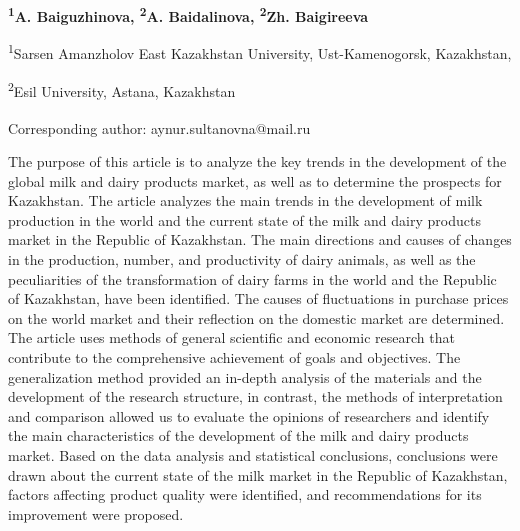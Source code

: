 
\begin{articleheader}

{\bfseries
\textsuperscript{1}A. Baiguzhinova,
\textsuperscript{2}A. Baidalinova\textsuperscript{\envelope},
\textsuperscript{2}Zh. Baigireeva
}
\end{articleheader}

\begin{affiliation}
\textsuperscript{1}Sarsen Amanzholov East Kazakhstan University, Ust-Kamenogorsk, Kazakhstan,

\textsuperscript{2}Esil University, Astana, Kazakhstan

\raggedright \textsuperscript{\envelope }Corresponding author: aynur.sultanovna@mail.ru
\end{affiliation}

The purpose of this article is to analyze the key trends in the
development of the global milk and dairy products market, as well as to
determine the prospects for Kazakhstan. The article analyzes the main
trends in the development of milk production in the world and the
current state of the milk and dairy products market in the Republic of
Kazakhstan. The main directions and causes of changes in the production,
number, and productivity of dairy animals, as well as the peculiarities
of the transformation of dairy farms in the world and the Republic of
Kazakhstan, have been identified. The causes of fluctuations in purchase
prices on the world market and their reflection on the domestic market
are determined. The article uses methods of general scientific and
economic research that contribute to the comprehensive achievement of
goals and objectives. The generalization method provided an in-depth
analysis of the materials and the development of the research structure,
in contrast, the methods of interpretation and comparison allowed us to
evaluate the opinions of researchers and identify the main
characteristics of the development of the milk and dairy products
market. Based on the data analysis and statistical conclusions,
conclusions were drawn about the current state of the milk market in the
Republic of Kazakhstan, factors affecting product quality were
identified, and recommendations for its improvement were proposed.


